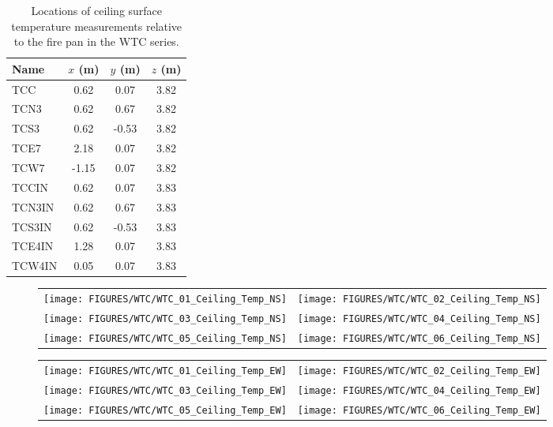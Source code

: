 \begin{table}[h!]
\caption{Locations of ceiling surface temperature measurements relative to the fire pan in the WTC series.}
\begin{center}
\begin{tabular}{|l|c|c|c|}
\hline
Name                & $x$ (m)   & $y$ (m)   & $z$ (m)   \\ \hline \hline
TCC                 & 0.62      & 0.07      & 3.82      \\ \hline
TCN3                & 0.62      & 0.67      & 3.82      \\ \hline
TCS3                & 0.62      & -0.53     & 3.82      \\ \hline
TCE7                & 2.18      & 0.07      & 3.82      \\ \hline
TCW7                & -1.15     & 0.07      & 3.82      \\ \hline \hline
TCCIN               & 0.62      & 0.07      & 3.83      \\ \hline
TCN3IN              & 0.62      & 0.67      & 3.83      \\ \hline
TCS3IN              & 0.62      & -0.53     & 3.83      \\ \hline
TCE4IN              & 1.28      & 0.07      & 3.83      \\ \hline
TCW4IN              & 0.05      & 0.07      & 3.83      \\ \hline
\end{tabular}
\end{center}
\label{WTC_Ceiling}
\end{table}

\newpage

\begin{figure}[p]
\begin{tabular*}{\textwidth}{l@{\extracolsep{\fill}}r}
\texttt{[image: FIGURES/WTC/WTC\_01\_Ceiling\_Temp\_NS]} &
\texttt{[image: FIGURES/WTC/WTC\_02\_Ceiling\_Temp\_NS]} \\
\texttt{[image: FIGURES/WTC/WTC\_03\_Ceiling\_Temp\_NS]} &
\texttt{[image: FIGURES/WTC/WTC\_04\_Ceiling\_Temp\_NS]} \\
\texttt{[image: FIGURES/WTC/WTC\_05\_Ceiling\_Temp\_NS]} &
\texttt{[image: FIGURES/WTC/WTC\_06\_Ceiling\_Temp\_NS]}
\end{tabular*}
\label{NIST_WTC_Ceiling_NS}
\end{figure}

\begin{figure}[p]
\begin{tabular*}{\textwidth}{l@{\extracolsep{\fill}}r}
\texttt{[image: FIGURES/WTC/WTC\_01\_Ceiling\_Temp\_EW]} &
\texttt{[image: FIGURES/WTC/WTC\_02\_Ceiling\_Temp\_EW]} \\
\texttt{[image: FIGURES/WTC/WTC\_03\_Ceiling\_Temp\_EW]} &
\texttt{[image: FIGURES/WTC/WTC\_04\_Ceiling\_Temp\_EW]} \\
\texttt{[image: FIGURES/WTC/WTC\_05\_Ceiling\_Temp\_EW]} &
\texttt{[image: FIGURES/WTC/WTC\_06\_Ceiling\_Temp\_EW]}
\end{tabular*}
\label{NIST_WTC_Ceiling_EW}
\end{figure}

